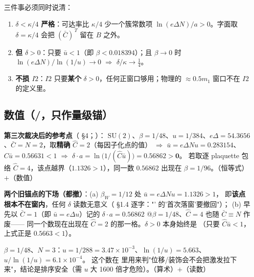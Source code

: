 三件事必须同时说清：

\begin{enumerate}[label=(\alph*)]
\item \textbf{$\delta<\kappa/4$ 严格}：可达率比 $\kappa/4$ 少一个簇常数项 $\ln(e\Delta N)/a>0$。字面取 $\delta=\kappa/4$
会把 $(\bar C)^{\,T}$ 留在 $B$ 之外。\LT
\item \textbf{但 $\delta>0$}：只要 $\bar u<1$（即 $\beta<0.018394$）；且 $\beta\to0$ 时 $\ln(e\Delta N)/\ln(1/u)\to0$ $\Rightarrow$ $\delta/\kappa\to\tfrac14$。\LT
\item \textbf{不损 $I2$}：$I2$ 只要\textbf{某个} $\delta>0$，任何正窗口够用；物理的 $\approx0.5m_1$ 窗口不在 $I2$ 的定义里。\LT
\end{enumerate}

\subsection{数值（\LE/\LM，只作量级锚）}

\LM{} \textbf{第三次裁决后的参考点}（ \S4；）：
$\mathrm{SU}(2)$、$\beta=1/48$、$u=1/384$、$e\Delta=54.3656$、$\bar C=N=2$，取\textbf{精确} $\hat C=2$（每因子化点的值）
$\Rightarrow$ $\bar u=e\Delta Nu=0.283154$、$\hat C\bar u=0.56631<1$ $\Rightarrow$ $\delta\cdot a=\ln\!\big(1/(\hat C\bar u)\big)=\mathbf{0.56862>0}$。
若取逐 plaquette 包络 $\hat C=4$，该点越界（$1.1326>1$），同一数 $0.56862$ 出现在 $\beta=1/96$。\LT{}（恒等式）$+$\LE{}（数值）

\LM{} \textbf{两个旧锚点的下场（都撤）}：(a) $\beta_W=1/12$ 处 $\bar u=e\Delta Nu=1.1326>1$，
即\textbf{该点根本不在窗内}，任何 $\delta$ 读数无意义（ \S1.4 逐字："' 的'首次落窗'要撤回"）；
(b) 早先以 $\bar C=1$（即 $\bar u=e\Delta u$）记的 $\delta\cdot a=0.56862$ @$\beta=1/48$、$\hat C=4$ 也随 $\bar C\equiv N$ 作废——
同一个数现在出现在 $\hat C=2$ 的那一格。$\delta>0$ 本身始终是 \LT{}（只要 $\hat C\bar u<1$，上式正是 $0.5663<1$）。\LM

\LM{} $\beta=1/48$、$N=3$：$u=1/288=3.47\times10^{-3}$、$\ln(1/u)=5.663$、$u/\ln(1/u)=6.1\times10^{-4}$。
这个数在  里用来判"位移/装饰会不会把激发拉下来"，结论是排序安全（需 $u$ 大 1600 倍才危险）。\LT{}（算术）$+$\LE{}（读数）

